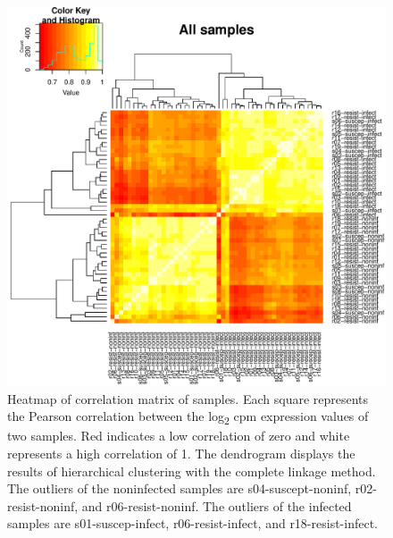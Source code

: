 \documentclass[fleqn,10pt]{wlscirep}
\begin{document}
\begin{figure}[ht]
\centering
\includegraphics[width=\linewidth]{../figure/heatmap-all-samples.pdf}
\caption{
Heatmap of correlation matrix of samples. Each square represents the
Pearson correlation between the log\textsubscript{2} cpm expression
values of two samples. Red indicates a low correlation of zero and
white represents a high correlation of 1. The dendrogram displays the
results of hierarchical clustering with the complete linkage method.
The outliers of the noninfected samples are s04-suscept-noninf,
r02-resist-noninf, and r06-resist-noninf. The outliers of the infected
samples are s01-suscep-infect, r06-resist-infect, and
r18-resist-infect.
}
\label{fig:heat-all}
\end{figure}
\end{document}
